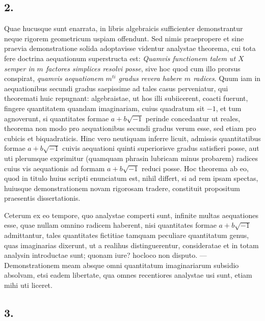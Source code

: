 \documentclass[14pt]{memoir}
\theoremstyle{plain}
\theoremstyle{remark}
\begin{document}
\subsection*{2.}

Quae hucusque sunt enarrata, in libris algebraicis sufficienter demonstrantur neque rigorem geometricum uspiam offendunt. Sed nimis praepropere et sine praevia demonstratione solida adoptavisse videntur analystae theorema, cui tota fere doctrina aequationum superstructa est: \textit{Quamvis functionem talem ut \(X\) semper in \(m\) factores simplices resolvi posse}, sive hoc quod cum illo prorsus conspirat, \textit{quamvis aequationem \(m^{ti}\) gradus revera habere \(m\) radices}. Quum iam in aequationibus secundi gradus saepissime ad tales casus perveniatur, qui theoremati huic repugnant: algebraistae, ut hos illi subiicerent, coacti fuerunt, fingere quantitatem quandam imaginariam, cuius quadratum sit \(-1\), et tum agnoverunt, si quantitates formae \(a+b\surd{-1}\) perinde concedantur ut reales, theorema non modo pro aequationibus secundi gradus verum esse, sed etiam pro cubicis et biquadraticis. Hinc vero neutiquam inferre licuit, admissis quantitatibus formae \(a+b\surd{-1}\) cuivis aequationi quinti superiorisve gradus satisfieri posse, aut uti plerumque exprimitur (quamquam phrasin lubricam minus probarem) radices cuius vis aequationis ad formam \(a+b\surd{-1}\) reduci posse. Hoc theorema ab eo, quod in titulo huius scripti enunciatum est, nihil differt, si ad rem ipsam spectas, huiusque demonstrationem novam rigorosam tradere, constituit propositum praesentis dissertationis.

Ceterum ex eo tempore, quo analystae comperti sunt, infinite multas aequationes esse, quae nullam omnino radicem haberent, nisi quantitates formae \(a+b\surd{-1}\) admittantur, tales quantitates fictitiae tamquam peculiare quantitatum genus, quas imaginarias dixerunt, ut a realihus distinguerentur, consideratae et in totam analysin introductae sunt; quonam iure? hocloco non disputo. — Demonstrationem meam absque omni quantitatum imaginariarum subsidio absolvam, etsi eadem libertate, qua omnes recentiores analystae usi sunt, etiam mihi uti liceret.

\subsection*{3.}
\end{document}
